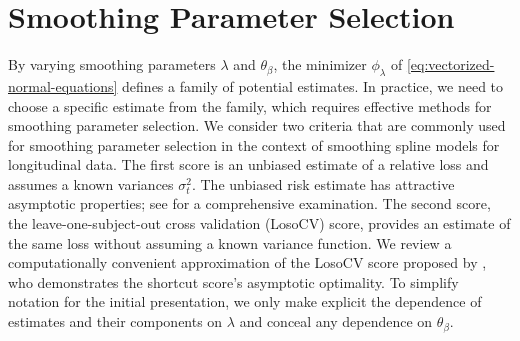 


\section{Smoothing Parameter Selection} \label{SSANOVA-smoothing-parameter-selection}
%
%

By varying smoothing parameters $\lambda$ and $\theta_\beta$, the minimizer $\phi_\lambda$ of \ref{eq:vectorized-normal-equations} defines a family of potential estimates. In practice, we need to choose a specific estimate from the family, which requires effective methods for smoothing parameter selection. We consider two criteria that are commonly used for smoothing parameter selection in the context of smoothing spline models for longitudinal data. The first score is an unbiased estimate of a relative loss and assumes a known variances $\sigma_t^2$. The unbiased risk estimate has attractive asymptotic properties; see \cite{gu2013smoothing} for a comprehensive examination. The second score, the leave-one-subject-out cross validation (LosoCV) score, provides an estimate of the same loss without assuming a known variance function. We review a computationally convenient approximation of the LosoCV score proposed by \cite{xu2012asymptotic}, who demonstrates the shortcut score's asymptotic optimality. To simplify notation for the initial presentation, we only make explicit the dependence of estimates and their components on $\lambda$ and conceal any dependence on $\theta_\beta$. 


